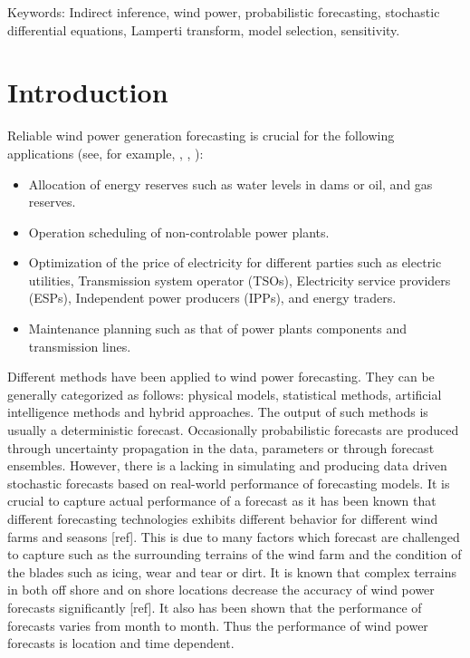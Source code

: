 \documentclass[11pt,english]{article}
\begin{document}
{\color{red}Keywords: Indirect inference, wind power, probabilistic forecasting, stochastic differential equations, Lamperti transform, model selection, sensitivity.}



\section{Introduction}  \label{Section_1}

Reliable wind power generation forecasting is crucial for the following applications (see, for example, \cite[5]{gieb}, \cite[162]{chang}, \cite{zhbo}):
\begin{itemize}
\item Allocation of energy reserves such as water levels in dams or oil, and gas reserves.
\item Operation scheduling of non-controlable power plants.
\item Optimization of the price of electricity for different parties such as electric utilities, Transmission system operator (TSOs), Electricity service providers (ESPs), Independent power producers (IPPs), and energy traders.
\item Maintenance planning such as that of power plants components and transmission lines.

\end{itemize}

Different methods have been applied to wind power forecasting. They can be generally categorized as follows: physical models, statistical methods, artificial intelligence methods and hybrid approaches. The output of such methods is usually a deterministic forecast. Occasionally probabilistic forecasts are produced through uncertainty propagation in the data, parameters or through forecast ensembles. However, there is a lacking in simulating and producing data driven stochastic forecasts based on real-world performance of forecasting models. It is crucial to capture actual performance of a forecast as it has been known that different forecasting technologies exhibits different behavior for different wind farms and seasons [ref]. This is due to many factors which forecast are challenged to capture such as the surrounding terrains of the wind farm and the condition of the blades such as icing, wear and tear or dirt. It is known that complex terrains in both off shore and on shore locations decrease the accuracy of wind power forecasts significantly [ref]. It also has been shown that the performance of forecasts varies from month to month. Thus the performance of wind power forecasts is location and time dependent.
\end{document}
